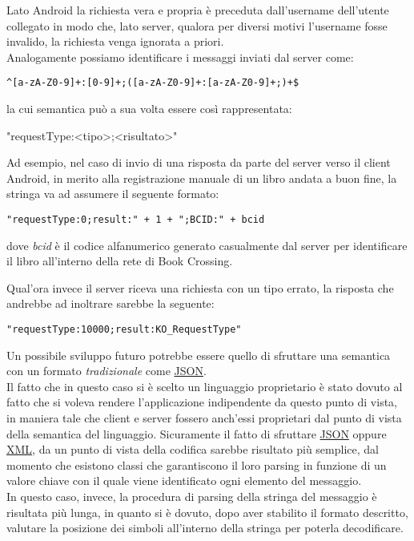 \noindent Lato Android la richiesta vera e propria è preceduta dall'username dell'utente collegato in modo che, lato server, qualora per diversi motivi l'username fosse invalido, la richiesta venga ignorata a priori.
\\ \noindent
Analogamente possiamo identificare i messaggi inviati dal server come:
\begin{lstlisting}[caption={\textit{RegEx} utilizzata lato server per l'interpretazione delle richieste},captionpos=b]
	^[a-zA-Z0-9]+:[0-9]+;([a-zA-Z0-9]+:[a-zA-Z0-9]+;)+$
\end{lstlisting}
la cui semantica può a sua volta essere così rappresentata:
\begin{center}
	"requestType:<tipo>;<risultato>"
\end{center}

\noindent Ad esempio, nel caso di invio di una risposta da parte del server verso il client Android, in merito alla registrazione manuale di un libro andata a buon fine, la stringa va ad assumere il seguente formato:
\begin{lstlisting}[caption={Risposta OK},captionpos=b]
	"requestType:0;result:" + 1 + ";BCID:" + bcid
\end{lstlisting}

dove \textit{bcid} è il codice alfanumerico generato casualmente dal server per identificare il libro all'interno della rete di Book Crossing.

Qual'ora invece il server riceva una richiesta con un tipo errato, la risposta che andrebbe ad inoltrare sarebbe la seguente:
\begin{lstlisting}[caption={Risposta KO},captionpos=b]
	"requestType:10000;result:KO_RequestType"
\end{lstlisting}
Un possibile sviluppo futuro potrebbe essere quello di sfruttare una semantica con un formato \textit{tradizionale} come \underline{JSON}.
\\ \noindent
Il fatto che in questo caso si è scelto un linguaggio proprietario è stato dovuto al fatto che si voleva rendere l'applicazione indipendente da questo punto di vista, in maniera tale che client e server fossero anch'essi proprietari dal punto di vista della semantica del linguaggio. Sicuramente il fatto di sfruttare \underline{JSON} oppure \underline{XML}, da un punto di vista della codifica sarebbe risultato più semplice, dal momento che esistono classi che garantiscono il loro parsing in funzione di un valore chiave con il quale viene identificato ogni elemento del messaggio. 
\\ \noindent
In questo caso, invece, la procedura di parsing della stringa del messaggio è risultata più lunga, in quanto si è dovuto, dopo aver stabilito il formato descritto, valutare la posizione dei simboli all'interno della stringa per poterla decodificare. 



